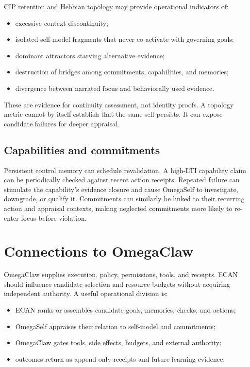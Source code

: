 \documentclass[11pt]{article}
\begin{document}
CIP retention and Hebbian topology may provide operational indicators of:
\begin{itemize}
  \item excessive context discontinuity;
  \item isolated self-model fragments that never co-activate with governing goals;
  \item dominant attractors starving alternative evidence;
  \item destruction of bridges among commitments, capabilities, and memories;
  \item divergence between narrated focus and behaviorally used evidence.
\end{itemize}

These are evidence for continuity assessment, not identity proofs.  A topology
metric cannot by itself establish that the same self persists.  It can expose
candidate failures for deeper appraisal.

\subsection{Capabilities and commitments}

Persistent control memory can schedule revalidation.  A high-LTI capability
claim can be periodically checked against recent action receipts.  Repeated
failure can stimulate the capability's evidence closure and cause OmegaSelf to
investigate, downgrade, or qualify it.  Commitments can similarly be linked to
their recurring action and appraisal contexts, making neglected commitments
more likely to re-enter focus before violation.

\section{Connections to OmegaClaw}

OmegaClaw supplies execution, policy, permissions, tools, and receipts.  ECAN
should influence candidate selection and resource budgets without acquiring
independent authority.  A useful operational division is:
\begin{itemize}
  \item ECAN ranks or assembles candidate goals, memories, checks, and actions;
  \item OmegaSelf appraises their relation to self-model and commitments;
  \item OmegaClaw gates tools, side effects, budgets, and external authority;
  \item outcomes return as append-only receipts and future learning evidence.
\end{itemize}
\end{document}
